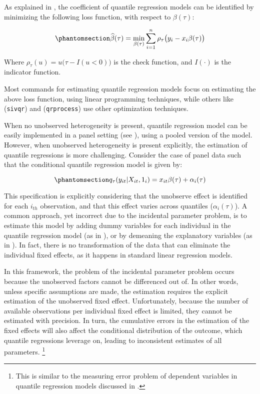 \documentclass[bib]{statapress}
\begin{document}
As explained in \citet{wooldridge2010}, the coefficient of quantile
regression models can be identified by minimizing the following loss
function, with respect to \(\beta(\tau)\):

\begin{equation}\phantomsection\label{eq-qloss}{
\hat\beta(\tau) = \min_{\beta(\tau)} \sum_{i=1}^{n} \rho_\tau \big(y_i-x_i\beta(\tau)\big)
}\end{equation}

Where \(\rho_\tau(u)=u\big(\tau-I(u<0)\big)\) is the check function, and
\(I(\cdot)\) is the indicator function.

Most commands for estimating quantile regression models focus on
estimating the above loss function, using linear programming techniques,
while others like \citet{kaplan2017} (\texttt{sivqr}) and
\citet{chernozhukov2022} (\texttt{qrprocess}) use other optimization
techniques.

When no unobserved heterogeneity is present, quantile regression model
can be easily implemented in a panel setting (see
\citet{wooldridge2010}), using a pooled version of the model. However,
when unobserved heterogeneity is present explicitly, the estimation of
quantile regressions is more challenging. Consider the case of panel
data such that the conditional quantile regression model is given by:

\begin{equation}\phantomsection\label{eq-feqr}{q_\tau(y_{it}|X_{it},1_i)=x_{it}\beta(\tau)+\alpha_i(\tau) 
}\end{equation}

This specification is explicitly considering that the unobserve effect
is identified for each \(i_{th}\) observation, and that this effect
varies across quantiles (\(\alpha_i(\tau)\)). A common approach, yet
incorrect due to the incidental parameter problem, is to estimate this
model by adding dummy variables for each individual in the quantile
regression model (as in \citet{budig2001}), or by demeaning the
explanatory variables (as in \citet{budig2010}). In fact, there is no
transformation of the data that can eliminate the individual fixed
effects, as it happens in standard linear regression models.

In this framework, the problem of the incidental parameter problem
occurs because the unobserved factors cannot be differenced out of. In
other words, unless specific assumptions are made, the estimation
requires the explicit estimation of the unobserved fixed effect.
Unfortunately, because the number of available observations per
individual fixed effect is limited, they cannot be estimated with
precision. In turn, the cumulative errors in the estimation of the fixed
effects will also affect the conditional distribution of the outcome,
which quantile regressions leverage on, leading to inconsistent
estimates of all parameters. \footnote{This is similar to the measuring
  error problem of dependent variables in quantile regression models
  discussed in \citet{hausman2021}.}
\end{document}

